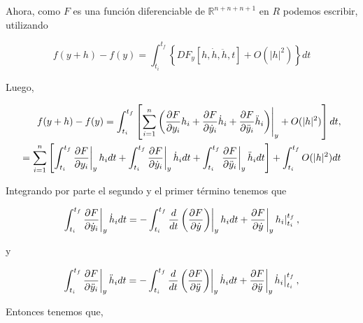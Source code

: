 \documentclass[a4paper,10pt]{article}
\numberwithin{equation}{section}
\newcommand{\zerodel}{.\kern-\nulldelimiterspace}
\begin{document}
Ahora, como $F$ es una función diferenciable de $\mathbb{R}^{n+n+n+1}$ en $R$ podemos 
escribir, utilizando 

\begin{equation}
 f(y+h) - f(y) =  \int_{t_{i}}^{t_{f}} \left\{DF_y[h,\dot{h},\ddot{h},t] + O(|h|^2) \right\}dt
\end{equation}

Luego,

\begin{align*}
 f(y+h) - f(y) = \int_{t_{i}}^{t_{f}} \left[ \left\zerodel \sum_{i=1}^n  \left( \frac{\partial F}{\partial y_i}h_i + 
 \frac{\partial F}{\partial \dot{y}_i}\dot{h}_i + \frac{\partial F}{\partial \ddot{y}_i}\ddot{h}_i\right)\right|_{y} 
 + O(|h|^2) \right]dt, \\
%  
	      = \sum_{i=1}^n \left[\int_{t_{i}}^{t_{f}}\left\zerodel\frac{\partial F}{\partial y_i}\right|_y h_i dt  
	      + \int_{t_{i}}^{t_{f}} \left\zerodel\frac{\partial F}{\partial \dot{y}_i}\right|_y \dot{h}_i dt
	       + \int_{t_{i}}^{t_{f}} \left\zerodel\frac{\partial F}{\partial \ddot{y}_i}\right|_y \ddot{h}_i dt\right] 
	       +  \int_{t_{i}}^{t_{f}} O(|h|^2)dt
\end{align*}

Integrando por parte el segundo y el primer término tenemos que

\begin{equation}
  \int_{t_{i}}^{t_{f}} \left\zerodel\frac{\partial F}{\partial \dot{y}_i}\right|_y \dot{h}_i dt = 
  - \int_{t_{i}}^{t_{f}} \frac{d}{dt}\left(\left\zerodel\frac{\partial F}{\partial \dot{y}}\right)\right|_y h_i dt + 
  \left\zerodel\frac{\partial F}{\partial \dot{y}}\right|_y \left\zerodel h_i\right|_{t_{i}}^{t_{f}},
\end{equation}

y

\begin{equation}
  \int_{t_{i}}^{t_{f}} \left\zerodel\frac{\partial F}{\partial \ddot{y}_i}\right|_y \ddot{h}_i dt = 
  - \int_{t_{i}}^{t_{f}} \frac{d}{dt}\left(\left\zerodel\frac{\partial F}{\partial \ddot{y}}\right)\right|_y \dot{h}_i dt + 
  \left\zerodel\frac{\partial F}{\partial \ddot{y}}\right|_y \left\zerodel \dot{h}_i\right|_{t_{i}}^{t_{f}},
\end{equation}

Entonces tenemos que,
\end{document}
